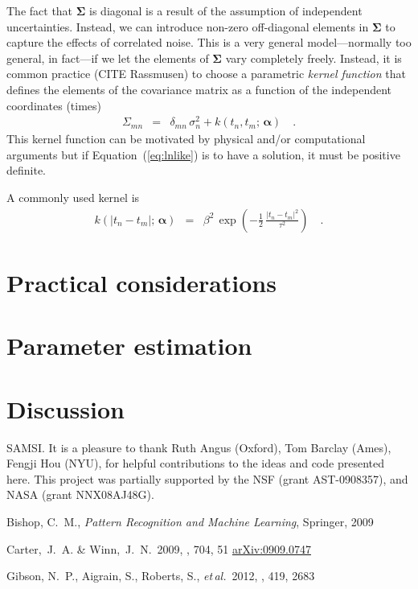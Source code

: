 \documentclass[12pt,preprint]{aastex}
\newcommand{\foreign}[1]{\emph{#1}}
\newcommand{\etal}{\foreign{et\,al.}}
\newcommand{\Eq}[1]{Equation~(\ref{eq:#1})}
\newcommand{\eq}[1]{\Eq{#1}}
\newcommand{\sectlabel}[1]{\label{sect:#1}}
\newcommand{\bvec}[1]{\ensuremath{\boldsymbol{#1}}}
\begin{document}
The fact that $\bvec{\Sigma}$ is diagonal is a result of the assumption of
independent uncertainties.
Instead, we can introduce non-zero off-diagonal elements in $\bvec{\Sigma}$ to
capture the effects of correlated noise.
This is a very general model---normally too general, in fact---if we let the
elements of $\bvec{\Sigma}$ vary completely freely.
Instead, it is common practice (CITE Rassmusen) to choose a parametric
\emph{kernel function} that defines the elements of the covariance matrix as a
function of the independent coordinates (times)
\begin{eqnarray}
\Sigma_{mn} &=& \delta_{mn}\,\sigma_n^2 + k(t_n,t_m;\,\bvec{\alpha})\quad.
\end{eqnarray}
This kernel function can be motivated by physical and/or computational
arguments but if \eq{lnlike} is to have a solution, it must be positive
definite.

A commonly used kernel is
\begin{eqnarray}
k(|t_n-t_m|;\,\bvec{\alpha}) &=&
\beta^2 \, \exp \left ( -\frac{1}{2}\,\frac{|t_n-t_m|^2}{\tau^2} \right )
\quad.
\end{eqnarray}

\section{Practical considerations}\sectlabel{practical}

\section{Parameter estimation}\sectlabel{parameters}

\section{Discussion}\sectlabel{discussion}

\acknowledgments
SAMSI. %
It is a pleasure to thank
    Ruth Angus (Oxford),
    Tom Barclay (Ames),
    Fengji Hou (NYU),
for helpful contributions to the ideas and code presented here.
This project was partially supported by the NSF (grant AST-0908357), and NASA
(grant NNX08AJ48G).

\newcommand{\arxiv}[1]{\href{http://arxiv.org/abs/#1}{arXiv:#1}}
\begin{thebibliography}{}\raggedright

Bishop, C.~M., \emph{Pattern Recognition and Machine Learning}, Springer, 2009

Carter,~J.~A. \& Winn,~J.~N.\ 2009, \apj, 704, 51
\arxiv{0909.0747}

\bibitem[Gibson \etal(2012)]{gibson-gp}
Gibson, N.~P., Aigrain, S., Roberts, S., \etal\ 2012, \mnras, 419, 2683

\end{thebibliography}
\end{document}
